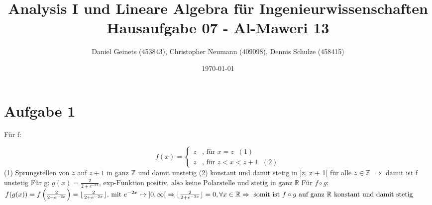 \documentclass[a4paper, 11pt]{article}
\author{Daniel Geinets (453843), Christopher Neumann (409098), Dennis Schulze (458415)}
\date{\today}
\title{Analysis I und Lineare Algebra für Ingenieurwissenschaften \large  \\ Hausaufgabe 07 - Al-Maweri 13}
\begin{document}
\maketitle
\tableofcontents

\setcounter{secnumdepth}{0}
\newcommand{\tuple}[1]{\left(#1\right)}
\renewcommand{\cfrac}[3]{#1 \tuple{\frac{#2}{#3}}}
\newcommand{\R}{\mathbb{R}}
\newcommand{\Z}{\mathbb{Z}}
\newcommand{\Q}{\mathbb{Q}}
\newcommand{\N}{\mathbb{N}}
\newcommand{\C}{\mathbb{C}}

\makeatletter
\renewcommand*\env@matrix[1][*\c@MaxMatrixCols c]{%
\hskip -\arraycolsep
\let\@ifnextchar\new@ifnextchar
\array{#1}}
\makeatother

\pagebreak

\section{Aufgabe 1}
\label{sec:orgf02d8c6}

Für f:
\newline

$$ f(x) =
    \begin{cases}
        z   & \text{, für } x = z \;\;(1) \\
        z   & \text{, für } z < x < z + 1 \;\;(2)
    \end{cases} $$
\newline
\newline
(1) Sprungstellen von \(z\) auf \(z + 1\)
    in ganz \(\Z\) und damit unstetig \newline
(2) konstant und damit stetig in ]z, z + 1[
    für alle \(z \in \Z\) \newline
\(\Rightarrow\) damit ist f unstetig \newline
\newline
Für g:
\newline
\newline
\begin{math}
    g(x) = \frac{2}{2 + e^{-2x}}
    \text{, exp-Funktion positiv, also keine Polarstelle und stetig in ganz }\mathbb{R}
\end{math}
\newline
\newline
Für \(f \circ g\):
\newline
\newline
\begin{math}
    f(g(x)) = f\left(\frac{2}{2 + e^{-2x}}\right) =
        \lfloor \frac{2}{2 + e^{-2x}} \rfloor \text{, mit }
    e^{-2x} \mapsto \; ]0, \infty[ \\
    \Rightarrow \lfloor \frac{2}{2 + e^{-2x}} \rfloor = 0, \forall x \in \R \\
    \Rightarrow \text{ somit ist } f \circ g \text{ auf ganz } \R
    \text{ konstant und damit stetig}
\end{math}
\end{document}
